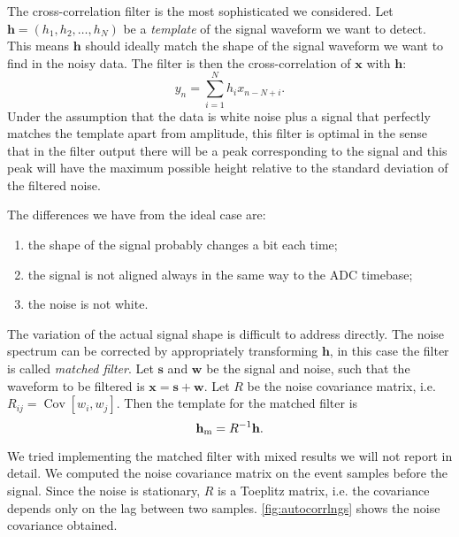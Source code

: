 The cross-correlation filter is the most sophisticated we considered. Let
$\mathbf h = (h_1, h_2, \ldots, h_N)$ be a \emph{template} of the signal
waveform we want to detect. This means $\mathbf h$ should ideally match the
shape of the signal waveform we want to find in the noisy data. The filter is
then the cross-correlation of $\mathbf x$ with $\mathbf h$:
%
\begin{equation}
    y_n = \sum_{i=1}^N h_i x_{n-N+i}.
\end{equation}
%
Under the assumption that the data is white noise plus a signal that perfectly
matches the template apart from amplitude, this filter is optimal in the sense
that in the filter output there will be a peak corresponding to the signal and
this peak will have the maximum possible height relative to the standard
deviation of the filtered noise.

The differences we have from the ideal case are:
%
\begin{enumerate}
    \item the shape of the signal probably changes a bit each time;
    \item the signal is not aligned always in the same way to the ADC timebase;
    \item the noise is not white.
\end{enumerate}

The variation of the actual signal shape is difficult to address directly. The
noise spectrum can be corrected by appropriately transforming $\mathbf h$, in
this case the filter is called \emph{matched filter}. Let $\mathbf s$ and
$\mathbf w$ be the signal and noise, such that the waveform to be filtered is
$\mathbf x = \mathbf s + \mathbf w$. Let $R$ be the noise covariance matrix,
i.e. $R_{ij} = \operatorname{Cov}[w_i, w_j]$. Then the template for the matched
filter is
%
\begin{equation}
    \mathbf h_\text m = R^{-1} \mathbf h.
    \label{eq:matched}    
\end{equation}


We tried implementing the matched filter with mixed results we will not report
in detail. We computed the noise covariance matrix on the event samples before
the signal. Since the noise is stationary, $R$ is a Toeplitz matrix, i.e. the
covariance depends only on the lag between two samples.
\autoref{fig:autocorrlngs} shows the noise covariance obtained.

